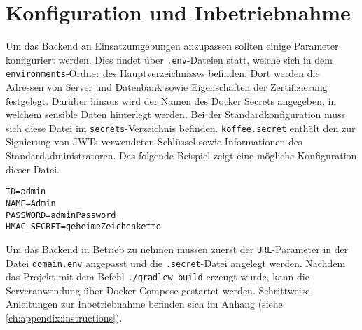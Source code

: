 \section{Konfiguration und Inbetriebnahme}
\label{sec:backend:configuration}
Um das Backend an Einsatzumgebungen anzupassen sollten einige Parameter konfiguriert werden.
Dies findet über \verb|.env|-Dateien statt, welche sich in dem \verb|environments|-Ordner des Hauptverzeichnisses befinden.
Dort werden die Adressen von Server und Datenbank sowie Eigenschaften der Zertifizierung festgelegt.
Darüber hinaus wird der Namen des Docker Secrets angegeben, in welchem sensible Daten hinterlegt werden.
Bei der Standardkonfiguration muss sich diese Datei im \verb|secrets|-Verzeichnis befinden.
\verb|koffee.secret| enthält den zur Signierung von JWTs verwendeten Schlüssel sowie Informationen des Standardadministratoren.
Das folgende Beispiel zeigt eine mögliche Konfiguration dieser Datei.
\begin{lstlisting}[style=simpleListing, title={Beispielinhalt von /secrets/koffee.secret}]
ID=admin
NAME=Admin
PASSWORD=adminPassword
HMAC_SECRET=geheimeZeichenkette
\end{lstlisting}
Um das Backend in Betrieb zu nehmen müssen zuerst der \verb|URL|-Parameter in der Datei \verb|domain.env| angepasst und die \verb|.secret|-Datei angelegt werden.
Nachdem das Projekt mit dem Befehl \verb|./gradlew build| erzeugt wurde, kann die Serveranwendung über Docker Compose gestartet werden.
Schrittweise Anleitungen zur Inbetriebnahme befinden sich im Anhang (siehe \autoref{ch:appendix:instructions}).

